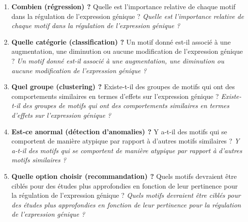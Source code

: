 \documentclass[mstat,12pt]{unswthesis}
\begin{document}
\begin{enumerate}
\item \textbf{Combien (régression) ?} Quelle est l'importance relative de chaque motif dans la régulation de l'expression génique ? \textit{Quelle est l'importance relative de chaque motif dans la régulation de l'expression génique ?}
\item \textbf{Quelle catégorie (classification) ?} Un motif donné est-il associé à une augmentation, une diminution ou aucune modification de l'expression génique ? \textit{Un motif donné est-il associé à une augmentation, une diminution ou aucune modification de l'expression génique ?}
\item \textbf{Quel groupe (clustering) ?} Existe-t-il des groupes de motifs qui ont des comportements similaires en termes d'effets sur l'expression génique ? \textit{Existe-t-il des groupes de motifs qui ont des comportements similaires en termes d'effets sur l'expression génique ?}
\item \textbf{Est-ce anormal (détection d'anomalies) ?} Y a-t-il des motifs qui se comportent de manière atypique par rapport à d'autres motifs similaires ? \textit{Y a-t-il des motifs qui se comportent de manière atypique par rapport à d'autres motifs similaires ?}
\item \textbf{Quelle option choisir (recommandation) ?} Quels motifs devraient être ciblés pour des études plus approfondies en fonction de leur pertinence pour la régulation de l'expression génique ?  \textit{Quels motifs devraient être ciblés pour des études plus approfondies en fonction de leur pertinence pour la régulation de l'expression génique ?}
\end{enumerate}
\end{document}

